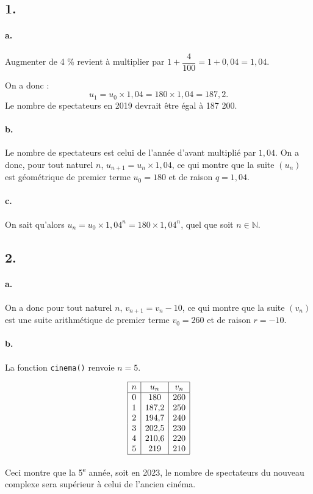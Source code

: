 \subsection*{1.}

\paragraph{a.} Augmenter de 4 \% revient à multiplier par \(1 + \dfrac{4}{100} = 1 + 0{,}04 = 1{,}04\).

On a donc :
\[
u_1 = u_0 \times 1{,}04 = 180 \times 1{,}04 = 187{,}2.
\]
Le nombre de spectateurs en 2019 devrait être égal à 187 200.

\paragraph{b.} Le nombre de spectateurs est celui de l'année d'avant multiplié par \(1{,}04\). On a donc, pour tout naturel \(n\), \(u_{n+1} = u_n \times 1{,}04\), ce qui montre que la suite \((u_n)\) est géométrique de premier terme \(u_0 = 180\) et de raison \(q = 1{,}04\).

\paragraph{c.} On sait qu'alors \(u_n = u_0 \times 1{,}04^n = 180 \times 1{,}04^n\), quel que soit \(n \in \mathbb{N}\).

\subsection*{2.}

\paragraph{a.} On a donc pour tout naturel \( n \), \( v_{n+1} = v_n - 10 \), ce qui montre que la suite \( (v_n) \) est une suite arithmétique de premier terme \( v_0 = 260 \) et de raison \(r = -10\).


\paragraph{b.} La fonction \texttt{cinema()} renvoie \( n = 5 \).

\[
\begin{array}{|c|c|c|}
\hline
n & u_n & v_n \\
\hline
0 & 180 & 260 \\
1 & 187{,}2 & 250 \\
2 & 194{,}7 & 240 \\
3 & 202{,}5 & 230 \\
4 & 210{,}6 & 220 \\
5 & 219 & 210 \\
\hline
\end{array}
\]

Ceci montre que la 5\textsuperscript{e} année, soit en 2023, le nombre de spectateurs du nouveau complexe sera supérieur à celui de l'ancien cinéma.

